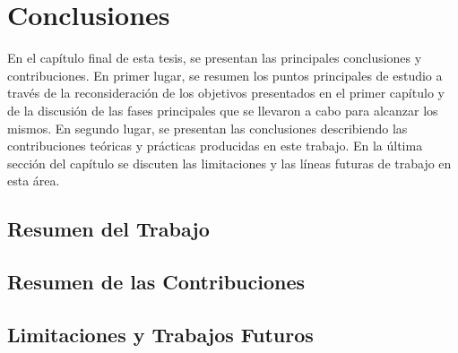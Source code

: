 \label{cap6}
\chapter{Conclusiones}

En el cap\'itulo final de esta tesis, se presentan las principales conclusiones y contribuciones. En primer lugar, se resumen los  puntos principales de 
estudio a trav\'es de la reconsideraci\'on de los objetivos presentados en el primer cap\'itulo y de la discusi\'on de las fases principales que se 
llevaron a cabo para alcanzar los mismos. En segundo lugar, se presentan las conclusiones describiendo las contribuciones te\'oricas y pr\'acticas producidas 
en este trabajo. En la \'ultima secci\'on del cap\'itulo se discuten las limitaciones  y las l\'ineas futuras de trabajo en esta \'area.


\section{Resumen del Trabajo}

\section{Resumen de las Contribuciones}

 \section{Limitaciones y Trabajos Futuros}
